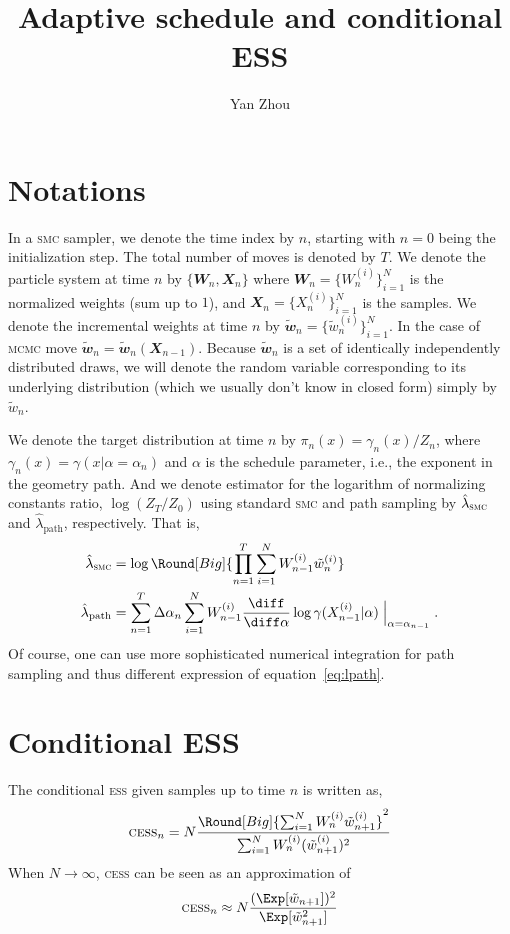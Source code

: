 \documentclass[11pt, fontset = Minion]{marticle}
\def\ess{\textsc{ess}\xspace}
\def\cess{\textsc{cess}\xspace}
\def\smc{\textsc{smc}\xspace}
\def\mcmc{\textsc{mcmc}\xspace}
\def\tbw{\tilde{\mathbfit{w}}}
\def\tw{\tilde{w}}
\def\W{\mathbfit{W}}
\def\X{\mathbfit{X}}
\def\lsmc{\hat\lambda_{\text{\smc}}}
\def\lpath{\hat\lambda_{\mathrm{path}}}
\begin{document}
  \title{Adaptive schedule and conditional ESS}
  \author{Yan Zhou}
  \maketitle

  \section{Notations}

  In a \smc sampler, we denote the time index by $n$, starting with $n = 0$
  being the initialization step. The total number of moves is denoted by $T$.
  We denote the particle system at time $n$ by $\{\W_n,\X_n\}$ where $\W_n =
  \{W_n^{(i)}\}_{i=1}^N$ is the normalized weights (sum up to $1$), and $\X_n
  = \{X_n^{(i)}\}_{i=1}^N$ is the samples. We denote the incremental weights
  at time $n$ by $\tbw_n = \{\tw_n^{(i)}\}_{i=1}^N$. In the case of \mcmc move
  $\tbw_n = \tbw_n(\X_{n-1})$. Because $\tbw_n$ is a set of
  identically independently distributed draws, we will denote the random
  variable corresponding to its underlying distribution (which we usually
  don't know in closed form) simply by $\tw_n$.

  We denote the target distribution at time $n$ by $\pi_n(x) =
  \gamma_n(x)/Z_n$, where $\gamma_n(x) = \gamma(x|\alpha=\alpha_n)$ and
  $\alpha$ is the schedule parameter, i.e., the exponent in the geometry path.
  And we denote estimator for the logarithm of normalizing constants ratio,
  $\log(Z_T/Z_0)$ using standard \smc and path sampling by $\lsmc$ and
  $\lpath$, respectively. That is,
  \begin{align}
    \lsmc &= \log\Round[Big]{
      \prod_{n=1}^T \sum_{i=1}^N W_{n-1}^{(i)} \tw_n^{(i)}} \label{eq:lsmc} \\
    \lpath &= \sum_{n=1}^T\Delta\alpha_n\sum_{i=1}^NW_{n-1}^{(i)}
    \frac{\diff}{\diff\alpha}
    \log\gamma(X_{n-1}^{(i)}|\alpha)\Bigm|_{\alpha=\alpha_{n-1}}.
    \label{eq:lpath}
  \end{align}
  Of course, one can use more sophisticated numerical integration for path
  sampling and thus different expression of equation~\eqref{eq:lpath}.

  \section{Conditional ESS}

  The conditional \ess given samples up to time $n$ is written as,
  \begin{equation}
    \text{\cess}_n = N\frac{\Round[Big]{
        \sum_{i=1}^N W_n^{(i)}\tw_{n+1}^{(i)}}^2}{
      \sum_{i=1}^N W_n^{(i)}(\tw_{n+1}^{(i)})^2}
  \end{equation}
  When $N\to\infty$, \cess can be seen as an approximation of
  \begin{equation}
    \text{\cess}_n \approx N\frac{(\Exp[\tw_{n+1}])^2}{\Exp[\tw_{n+1}^2]}
  \end{equation}
\end{document}
